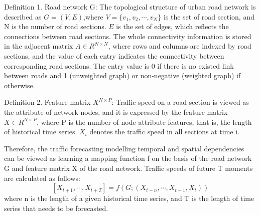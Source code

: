\documentclass[10pt,journal,compsoc]{IEEEtran}
\begin{document}
Definition 1. Road network G: The topological structure of urban road network is described as $G=(V,E)$,where $V=\{v_1,v_2,\cdots,v_N\}$ is the set of road section, and N is the number of road sections.  $E$ is the set of edges, which reflects the connections between road sections. The whole connectivity information is stored in the adjacent matrix $A\in R^{N\times N}$, where rows and columns are indexed by road sections, and the value of each entry indicates the connectivity between corresponding road sections. The entry value is 0 if there is no existed link between roads and 1 (unweighted graph) or non-negative (weighted graph) if otherwise.

Definition 2. Feature matrix $X^{N\times P}$: Traffic speed on a road section is viewed as the attribute of network nodes, and it is expressed by the feature matrix $X\in R^{N\times P}$, where P is the number of node attribute features, that is, the length of historical time series. $X_{i}$ denotes the traffic speed in all sections at time i.

\par Therefore, the traffic forecasting modelling temporal and spatial dependencies can be viewed as learning a mapping function f on the basis of the road network G and feature matrix X of the road network. Traffic speeds of future T moments are calculated as follows:
\begin{equation}
\left[X_{t+1},\cdots,X_{t+T}\right] = f\left(G;\left(X_{t-n},\cdots,X_{t-1},X_{t}\right)\right) 
\end{equation}
where n is the length of a given historical time series, and T is the length of time series that needs to be forecasted.
\end{document}

